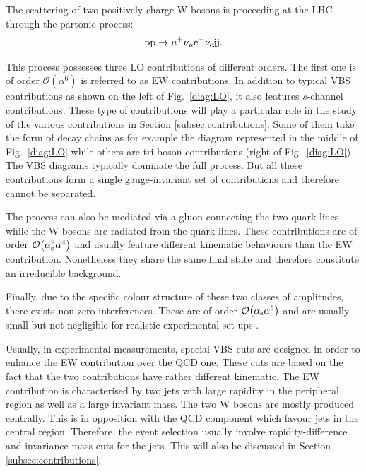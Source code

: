 The scattering of two positively charge W bosons is proceeding at the LHC through the partonic process:
%
\begin{equation}
 {\rm p}{\rm p}\to\mu^+\nu_\mu{\rm e}^+\nu_{\rm e}{\rm j}{\rm j}.
\end{equation}

This process possesses three LO contributions of different orders.
The first one is of order $\mathcal{O}{\left(\alpha^{6}\right)}$ is referred to as EW contributions.
In addition to typical VBS contributions as shown on the left of Fig.~\ref{diag:LO}, it also features $s$-channel contributions.
These type of contributions will play a particular role in the study of the various contributions in Section \ref{subsec:contributions}.
Some of them take the form of decay chains as for example the diagram represented in the middle of Fig.~\ref{diag:LO} while others are tri-boson contributions (right of Fig.~\ref{diag:LO})
The VBS diagrams typically dominate the full process.
But all these contributions form a single gauge-invariant set of contributions and therefore cannot be separated.

The process can also be mediated via a gluon connecting the two quark lines while the W bosons are radiated from the quark lines.
These contributions are of order $\mathcal{O}{\left(\alpha_\text{s}^{2}\alpha^{4}\right)}$ and usually feature different kinematic behaviours than the EW contribution.
Nonetheless they share the same final state and therefore constitute an irreducible background.

Finally, due to the specific colour structure of these two classes of amplitudes, there exists non-zero interferences.
These are of order $\mathcal{O}{\left(\alpha_{\rm s}\alpha^{5}\right)}$ and are usually small but not negligible for realistic experimental set-ups \cite{Biedermann:2017bss}.

Usually, in experimental measurements, special VBS-cuts are designed in order to enhance the EW contribution over the QCD one.
These cuts are based on the fact that the two contributions have rather different kinematic.
The EW contribution is characterised by two jets with large rapidity in the peripheral region as well as a large invariant mass.
The two W bosons are mostly produced centrally.
This is in opposition with the QCD component which favour jets in the central region.
Therefore, the event selection usually involve rapidity-difference and invariance mass cuts for the jets.
This will also be discussed in Section \ref{subsec:contributions}.

